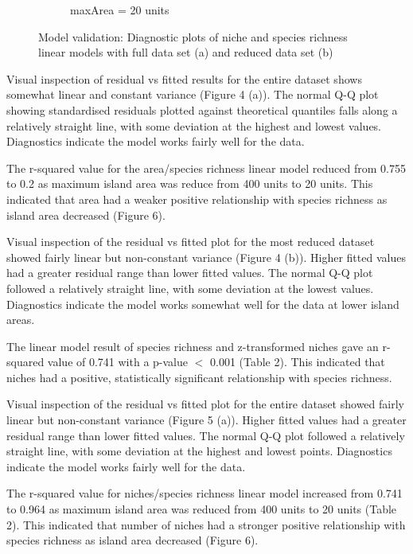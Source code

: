 \documentclass{article}
\begin{document}
\begin{figure}[h!]
\begin{subfigure}[b]{0.4\linewidth}
    \caption{maxArea = 20 units}
  \end{subfigure}
  \caption{Model validation: Diagnostic plots of niche and species richness linear models with full data set (a) and reduced data set (b)}
  \label{fig:Model validation niche/species LM}
\end{figure}\bigskip

\noindent Visual inspection of residual vs fitted results for the entire dataset shows somewhat linear and constant variance (Figure 4 (a)). The normal Q-Q plot showing standardised residuals plotted against theoretical quantiles falls along a relatively straight line, with some deviation at the highest and lowest values. Diagnostics indicate the model works fairly well for the data.  \bigskip

\noindent The r-squared value for the area/species richness linear model reduced from 0.755 to 0.2 as maximum island area was reduce from 400 units to 20 units. This indicated that area had a weaker positive relationship with species richness as island area decreased (Figure 6). \bigskip

\noindent Visual inspection of the residual vs fitted plot for the most reduced dataset showed fairly linear but non-constant variance (Figure 4 (b)). Higher fitted values had a greater residual range than lower fitted values. The normal Q-Q plot followed a relatively straight line, with some deviation at the lowest values. Diagnostics indicate the model works somewhat well for the data at lower island areas. \bigskip

\noindent The linear model result of species richness and z-transformed niches gave an r-squared value of 0.741 with a p-value $<$ 0.001 (Table 2). This indicated that niches had a positive, statistically significant relationship with species richness. \bigskip

\noindent Visual inspection of the residual vs fitted plot for the entire dataset showed fairly linear but non-constant variance (Figure 5 (a)). Higher fitted values had a greater residual range than lower fitted values. The normal Q-Q plot followed a relatively straight line, with some deviation at the highest and lowest points. Diagnostics indicate the model works fairly well for the data. \bigskip

\noindent The r-squared value for niches/species richness linear model increased from 0.741 to 0.964 as maximum island area was reduced from 400 units to 20 units (Table 2). This indicated that number of niches had a stronger positive relationship with species richness as island area decreased (Figure 6). \bigskip
\end{document}
